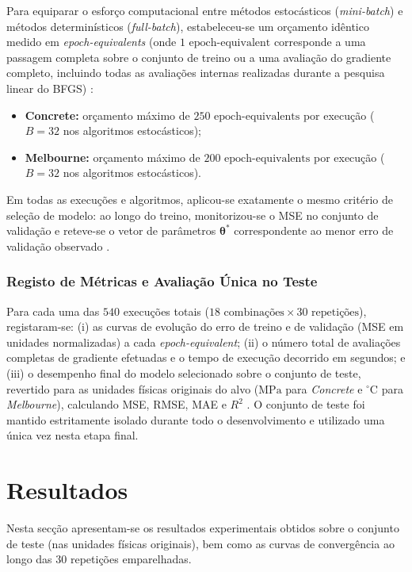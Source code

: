 \documentclass[conference]{IEEEtran}
\begin{document}
Para equiparar o esforço computacional entre métodos estocásticos (\textit{mini-batch}) e métodos determinísticos (\textit{full-batch}), estabeleceu-se um orçamento idêntico medido em \textit{epoch-equivalents} (onde $1\text{ epoch-equivalent}$ corresponde a uma passagem completa sobre o conjunto de treino ou a uma avaliação do gradiente completo, incluindo todas as avaliações internas realizadas durante a pesquisa linear do BFGS) \cite{b1}:
\begin{itemize}
    \item \textbf{Concrete:} orçamento máximo de $250\text{ epoch-equivalents}$ por execução ($B = 32$ nos algoritmos estocásticos);
    \item \textbf{Melbourne:} orçamento máximo de $200\text{ epoch-equivalents}$ por execução ($B = 32$ nos algoritmos estocásticos).
\end{itemize}
Em todas as execuções e algoritmos, aplicou-se exatamente o mesmo critério de seleção de modelo: ao longo do treino, monitorizou-se o MSE no conjunto de validação e reteve-se o vetor de parâmetros $\boldsymbol{\theta}^*$ correspondente ao menor erro de validação observado \cite{b1}.

\subsubsection{Registo de Métricas e Avaliação Única no Teste}
Para cada uma das $540$ execuções totais ($18\text{ combinações} \times 30\text{ repetições}$), registaram-se: (i) as curvas de evolução do erro de treino e de validação (MSE em unidades normalizadas) a cada \textit{epoch-equivalent}; (ii) o número total de avaliações completas de gradiente efetuadas e o tempo de execução decorrido em segundos; e (iii) o desempenho final do modelo selecionado sobre o conjunto de teste, revertido para as unidades físicas originais do alvo ($\text{MPa}$ para \textit{Concrete} e $^{\circ}\text{C}$ para \textit{Melbourne}), calculando MSE, RMSE, MAE e $R^2$ \cite{b1}. O conjunto de teste foi mantido estritamente isolado durante todo o desenvolvimento e utilizado uma única vez nesta etapa final.


\section{Resultados}

Nesta secção apresentam-se os resultados experimentais obtidos sobre o conjunto de teste (nas unidades físicas originais), bem como as curvas de convergência ao longo das $30$ repetições emparelhadas.
\end{document}
